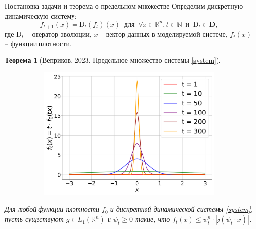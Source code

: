 \documentclass{beamer}
\newtheorem{theorem_rus}{Теорема}
\begin{document}
\begin{frame}{Постановка задачи и теорема о предельном множестве}
\vspace{-2mm}
 Определим дискретную динамическую систему:
    \begin{equation}
        \label{system}
        f_{t+1}(x) = \text{D}_t(f_t)(x) ~ \text{ для } ~ \forall x \in \mathbb{R}^n, t \in \mathbb{N} ~\text{ и } ~ \text{D}_t \in \mathbf{D},
    \end{equation}
    где $\text{D}_t$ -- оператор эволюции, $x$ -- вектор данных в моделируемой системе, $f_t(x)$ -- функции плотности.  
    \begin{theorem_rus}[Веприков, 2023. Предельное множество системы \eqref{system}] \label{delta}
        \begin{figure}
        \vspace{-0.61cm}
        \hspace{-6mm}
        \begin{minipage}{0.45\textwidth}
        \vspace{-0.57cm}
        \begin{figure}
        \includegraphics[width=1.22\textwidth]{fig/fig1_Normal.png}
    
        \end{figure}
        \end{minipage}
    \end{figure}
        Для любой функции плотности $f_0$ и дискретной динамической системы \eqref{system}, пусть существуют $ g \in L_1\left(\mathbb{R}^n\right)$ и $\psi_t \geq 0$ такие, что \color{blue}$f_t\left(x\right) \leq \psi_t^n \cdot |g(\psi_t \cdot x)|$. %
    

\end{theorem_rus}
\end{frame}
\end{document}
